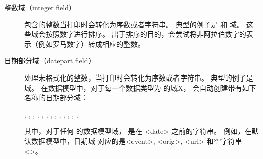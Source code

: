 \begin{description}
\begin{description}
\item[整数域（integer field）] 包含的整数当打印时会转化为序数或者字符串。
典型的例子是  和  域。
这些域会按照数字进行排序。
出于排序的目的，\biber 会尝试将非阿拉伯数字的表示（例如罗马数字）转成相应的整数。


\item[日期部分域（datepart field）] 处理未格式化的整数，当打印时会转化为序数或者字符串。
典型的例子是  域。
在数据模型中，对于每一个数据类型为  的域X，
会自动创建带有如下名称的日期部分域：
\begin{flushleft}
, , , , , , , , , , , , , 
\end{flushleft}
其中，对于任何  的数据模型域， 是在 <date> 之前的字符串。
例如，在默认数据模型中，日期域  对应的是<event>, <orig>, <url> 和空字符串 <>。



\end{description}
\end{description}
